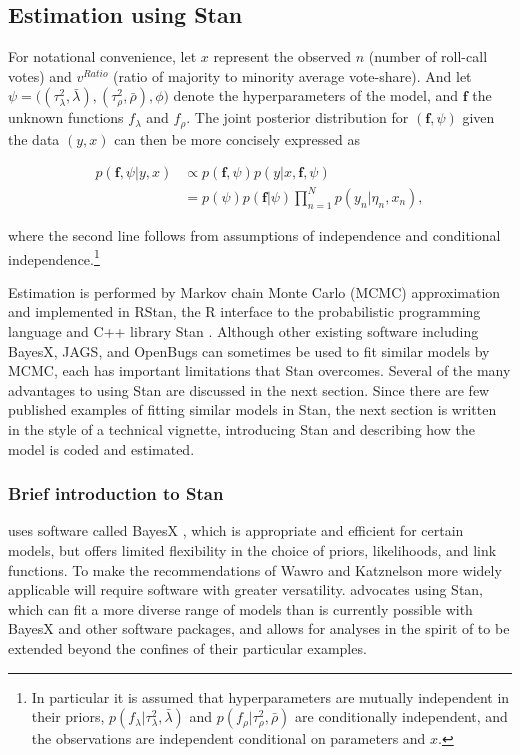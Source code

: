  \subsection{Estimation using Stan}
 \label{stan_intro}

For notational convenience, let $x$ represent the observed $n$ (number of roll-call votes) 
and $v^{Ratio}$ (ratio of majority to minority average vote-share).  And let 
$\psi = \big((\tau^2_\lambda, \bar{\lambda}), (\tau^2_\rho, \bar{\rho}), \phi \big)$ denote 
the hyperparameters of the model, and $\bm{f}$ the unknown functions  $f_\lambda$ and 
$f_\rho$. The joint posterior distribution for $(\bm{f}, \psi)$ given the data $(y, x)$ can then 
be more concisely expressed as 

\begin{align*}
p(\bm{f}, \psi | y, x) 
&\propto p(\bm{f}, \psi)  p(y | x, \bm{f}, \psi)  \\
&=p(\psi)  p(\bm{f} | \psi)   \prod_{n=1}^N p(y_n | \eta_n, x_n), 
\end{align*}

\noindent where the second line follows from assumptions of independence and conditional 
independence.\footnote{In particular it is assumed that hyperparameters are mutually independent 
in their priors, $p(f_\lambda | \tau^2_\lambda, \bar{\lambda})$ and $p(f_\rho | \tau^2_\rho, \bar{\rho})$ 
are conditionally independent, and the observations are independent conditional on parameters 
and $x$.}

Estimation is performed by Markov chain Monte Carlo (MCMC) approximation and implemented in 
RStan, the R interface to the probabilistic programming language and C++ library Stan 
. Although other existing software including BayesX, JAGS, and 
OpenBugs can sometimes be used to fit similar models by MCMC, each has important limitations 
that Stan overcomes. Several of the many advantages to using Stan are discussed in the next section. 
Since there are few published examples of fitting similar models in Stan, the next section is 
written in the style of a technical vignette, introducing Stan and describing how the model is coded 
and estimated. 

\subsubsection{Brief introduction to Stan}

 uses software called BayesX , which 
is appropriate and  efficient for certain models, but offers limited flexibility in the choice of priors, 
likelihoods, and link functions. To make the recommendations of Wawro and Katznelson more widely 
applicable will require software with greater versatility.  advocates 
using Stan, which can fit a more diverse range of models than is currently possible with BayesX 
and other software packages, and allows for analyses in the spirit of  
to be extended beyond the confines of their particular examples.  

